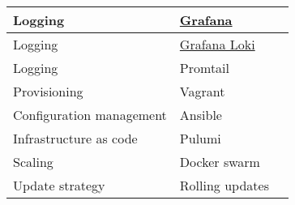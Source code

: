 \begin{longtable}{|p{}|p{} | p{}|}
    \hline
    Logging & \href{https://grafana.com/}{Grafana} & \\
    \hline
    Logging & \href{https://grafana.com/docs/loki/latest/}{Grafana Loki} & \\
    \hline
    Logging & Promtail & \\
    \hline
    Provisioning & Vagrant & \\
    \hline
    Configuration management & Ansible & \\
    \hline
    Infrastructure as code & Pulumi & \\
    \hline
    Scaling & Docker swarm & \\
    \hline
    Update strategy & Rolling updates & \\
    \hline
\end{longtable}